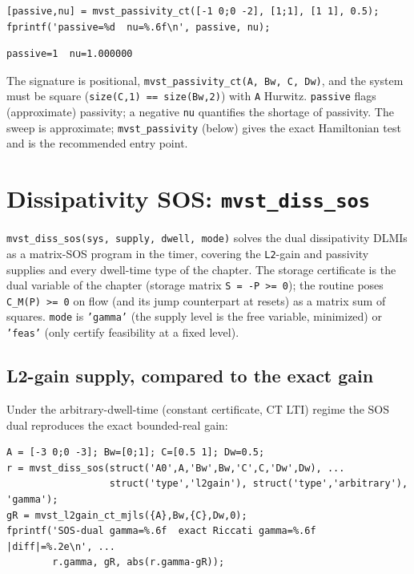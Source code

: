 \documentclass[11pt,oneside]{report}
\newcommand{\code}[1]{\texttt{#1}}
\begin{document}
\begin{lstlisting}[style=matlabstyle]
[passive,nu] = mvst_passivity_ct([-1 0;0 -2], [1;1], [1 1], 0.5);
fprintf('passive=%d  nu=%.6f\n', passive, nu);
\end{lstlisting}

\begin{lstlisting}[style=outputstyle]
passive=1  nu=1.000000
\end{lstlisting}

The signature is positional, \code{mvst\_passivity\_ct(A, Bw, C, Dw)}, and the system
must be square (\code{size(C,1) == size(Bw,2)}) with \code{A} Hurwitz. \code{passive} flags
(approximate) passivity; a negative \code{nu} quantifies the shortage of passivity.
The sweep is approximate; \code{mvst\_passivity} (below) gives the exact Hamiltonian
test and is the recommended entry point.

\hypertarget{dissipativity-sos-mvst_diss_sos}{%
\section{\texorpdfstring{Dissipativity SOS: \code{mvst\_diss\_sos}}{Dissipativity SOS: mvst\_diss\_sos}}\label{dissipativity-sos-mvst_diss_sos}}

\code{mvst\_diss\_sos(sys, supply, dwell, mode)} solves the dual dissipativity DLMIs as
a matrix-SOS program in the timer, covering the \code{L2}-gain and passivity supplies
and every dwell-time type of the chapter. The storage certificate is the dual
variable of the chapter (storage matrix \code{S = -P \textgreater{}= 0}); the routine poses
\code{C\_M(P) \textgreater{}= 0} on flow (and its jump counterpart at resets) as a matrix sum of
squares. \code{mode} is \code{'gamma'} (the supply level is the free variable, minimized)
or \code{'feas'} (only certify feasibility at a fixed level).

\hypertarget{l2-gain-supply-compared-to-the-exact-gain}{%
\subsection{L2-gain supply, compared to the exact gain}\label{l2-gain-supply-compared-to-the-exact-gain}}

Under the arbitrary-dwell-time (constant certificate, CT LTI) regime the SOS dual
reproduces the exact bounded-real gain:

\begin{lstlisting}[style=matlabstyle]
A = [-3 0;0 -3]; Bw=[0;1]; C=[0.5 1]; Dw=0.5;
r = mvst_diss_sos(struct('A0',A,'Bw',Bw,'C',C,'Dw',Dw), ...
                  struct('type','l2gain'), struct('type','arbitrary'), 'gamma');
gR = mvst_l2gain_ct_mjls({A},Bw,{C},Dw,0);
fprintf('SOS-dual gamma=%.6f  exact Riccati gamma=%.6f  |diff|=%.2e\n', ...
        r.gamma, gR, abs(r.gamma-gR));
\end{lstlisting}
\end{document}
